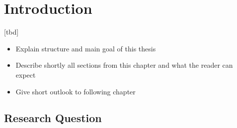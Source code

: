 \chapter{Introduction}

[tbd]

\begin{itemize}
	\item Explain structure and main goal of this thesis
	\item Describe shortly all sections from this chapter and what the reader can expect
	\item Give short outlook to following chapter
\end{itemize}












\section{Research Question}
\label{chapter:research_question}

